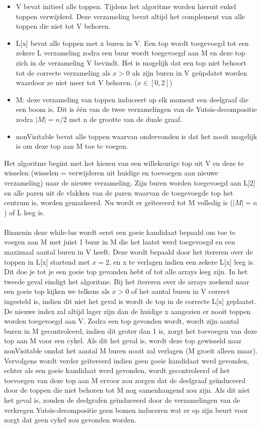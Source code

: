 \documentclass[11pt, a4paper, table]{article}
\theoremstyle{definition}
\theoremstyle{definition}
\theoremstyle{definition}
\begin{document}
\begin{itemize}
	\item V bevat initieel alle toppen. Tijdens het algoritme worden hieruit enkel toppen verwijderd. Deze verzameling bevat altijd het complement van alle toppen die niet tot V behoren. 
	\item L[x] bevat alle toppen met x buren in V. Een top wordt toegevoegd tot een zekere L verzameling zodra een buur wordt toegevoegd aan M en deze top zich in de verzameling V bevindt. Het is mogelijk dat een top niet behoort tot de correcte verzameling als $x>0$ als zijn buren in V ge\"{u}pdatet worden waardoor ze niet meer tot V behoren. ($x \in [0,2]$)
	\item M: deze verzameling van toppen induceert op elk moment een deelgraaf die een boom is. Dit is \'{e}\'{e}n van de twee verzamelingen van de Yutsis-decompositie zodra $|M|=n/2$ met n de grootte van de duale graaf. 
	\item nonVisitable bevat alle toppen waarvan ondervonden is dat het nooit mogelijk is om deze top aan M toe te voegen. 
\end{itemize} 
	Het algoritme begint met het kiezen van een willekeurige top uit V en deze te wisselen (wisselen = verwijderen uit huidige en toevoegen aan nieuwe verzameling) naar de nieuwe verzameling. Zijn buren worden toegevoegd aan L[2] en alle paren uit de vlakken van de paren waarvan de toegevoegde top het centrum is, worden gemarkeerd. Nu wordt er ge\"{i}tereerd tot M volledig is ($|M| = n$) of L leeg is. 
	\\\\Binnenin deze while-lus wordt eerst een goeie kandidaat bepaald om toe te voegen aan M met juist 1 buur in M die het laatst werd toegevoegd en een maximaal aantal buren in V heeft. Deze wordt bepaald door het itereren over de toppen in L[x] startend met $x=2$,  en x te verlagen indien een zekere L[x] leeg is. Dit doe je tot je een goeie top gevonden hebt of tot alle arrays leeg zijn. In het tweede geval eindigt het algoritme. Bij het itereren over de arrays zoekend naar een goeie top kijken we telkens als $x > 0$ of het aantal buren in V correct ingesteld is, indien dit niet het geval is wordt de top in de correcte L[x] geplaatst. De nieuwe index zal altijd lager zijn dan de huidige x aangezien er nooit toppen worden toegevoegd aan V. Zodra een top gevonden wordt, wordt zijn aantal buren in M gecontroleerd, indien dit groter dan 1 is, zorgt het toevoegen van deze top aan M voor een cykel. Als dit het geval is, wordt deze top gewisseld naar nonVisitable omdat het aantal M buren nooit zal verlagen (M groeit alleen maar). Vervolgens wordt verder ge\"{i}tereerd indien geen goeie kandidaat werd gevonden, echter als een goeie kandidaat werd gevonden, wordt gecontroleerd of het toevoegen van deze top aan M ervoor zou zorgen dat de deelgraaf ge\"{i}nduceerd door de toppen die niet behoren tot M nog samenhangend zou zijn. Als dit niet het geval is, zouden de deelgrafen ge\"{i}nduceerd door de verzamelingen van de verkregen Yutsis-decompositie geen bomen induceren wat er op zijn beurt voor zorgt dat geen cykel zou gevonden worden. 
\end{document}
